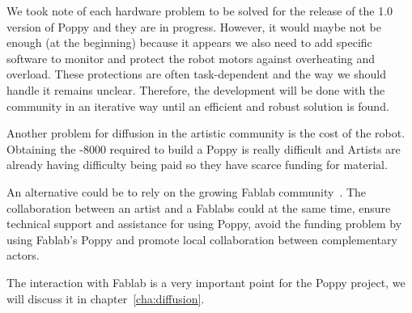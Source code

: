 We took note of each hardware problem to be solved for the release of the 1.0 version of Poppy and they are in progress. However, it would maybe not be enough (at the beginning) because it appears we also need to add specific software to monitor and protect the robot motors against overheating and overload. These protections are often task-dependent and the way we should handle it remains unclear. Therefore, the development will be done with the community in an iterative way until an efficient and robust solution is found.

Another problem for diffusion in the artistic community is the cost of the robot. Obtaining the -8000 required to build a Poppy is really difficult and Artists are already having difficulty being paid so they have scarce funding for material.

An alternative could be to rely on the growing Fablab community~\parencite{anderson2012makers}. The collaboration between an artist and a Fablabs could at the same time, ensure technical support and assistance for using Poppy, avoid the funding problem by using Fablab's Poppy and promote local collaboration between complementary actors.

The interaction with Fablab is a very important point for the Poppy project, we will discuss it in chapter~\ref{cha:diffusion}.

